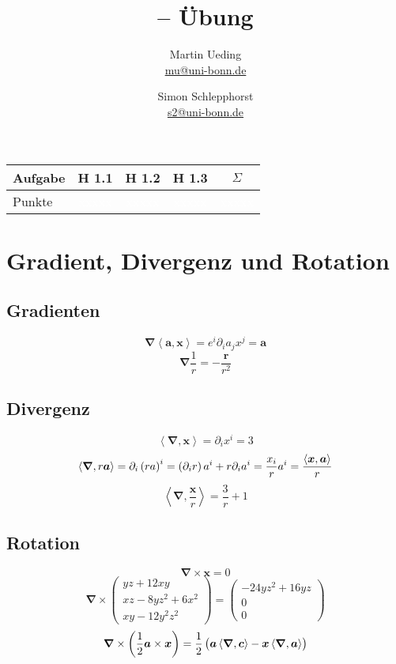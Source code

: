 \documentclass[11pt, ngerman]{article}
\title{\themodul{} -- Übung \theuebung \\ \vspace{0.5cm} \large{\thegruppe}}
\author{Martin Ueding \\ \small{\href{mailto:mu@uni-bonn.de}{mu@uni-bonn.de}} \and Simon Schlepphorst \\ \small{\href{mailto:s2@uni-bonn.de}{s2@uni-bonn.de}}}
\newcommand{\divergence}[1]{\inner{\vnabla}{#1}}
\newcommand{\inner}[2]{\left\langle #1, #2 \right\rangle}
\newcommand{\punkte}{\textcolor{white}{xxxxx}}
\newcommand{\vnabla}{\vec \nabla}
\renewcommand{\vec}[1]{\boldsymbol{#1}}
\begin{document}
\maketitle

\begin{table}[h]
	\centering
	\begin{tabular}{l|c|c|c|c}
		Aufgabe & H 1.1 & H 1.2 & H 1.3 & $\Sigma$   \\
		\hline
		Punkte & \punkte & \punkte & \punkte & \punkte
	\end{tabular}
\end{table}


\section{Gradient, Divergenz und Rotation}

\subsection{Gradienten}

\[ \vnabla \inner{\vec a}{\vec x} = e^i \partial_i a_j x^j = \vec a \]
\[ \vnabla \frac{1}{r} = - \frac{\vec r}{r^2} \]

\subsection{Divergenz}

\[ \divergence{\vec x} = \partial_i x^i = 3 \]
\[ \divergence{r \vec a} = \partial_i \del{r a}^i = \del{\partial_i r} a^i + r \partial_i a^i = \frac{x_i}{r} a^i = \frac{\inner{\vec x}{\vec a}}{r} \]
\[ \divergence{\frac{\vec x}{r}} = \frac{3}{r} + 1 \]

\subsection{Rotation}

\[ \vnabla \times \vec x = 0 \]
\[
	\vnabla \times \begin{pmatrix}
		yz + 12 xy \\
		xz - 8yz^2 + 6x^2 \\
		xy - 12y^2z^2
	\end{pmatrix} = \begin{pmatrix}
		-24yz^2 + 16 yz \\
		0 \\
		0
	\end{pmatrix}
\]
\[
	\vnabla \times \del{\frac 12 \vec a \times \vec x}
	= \frac 12 \del{\vec a \divergence{\vec c} - \vec x \divergence{\vec a}}
\]
\end{document}
